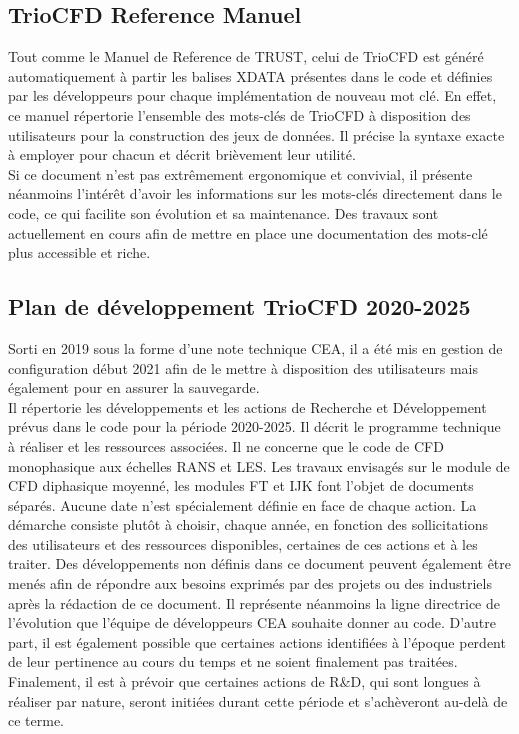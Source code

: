\subsection{TrioCFD Reference Manuel}
Tout comme le Manuel de Reference de TRUST, celui de TrioCFD est généré automatiquement à partir les balises XDATA présentes dans le code et définies par les développeurs pour chaque implémentation de nouveau mot clé. En effet, ce manuel répertorie l'ensemble des mots-clés de TrioCFD à disposition des utilisateurs pour la construction des jeux de données. Il précise la syntaxe exacte à employer pour chacun et décrit brièvement leur utilité.\\
Si ce document n'est pas extrêmement ergonomique et convivial, il présente néanmoins l'intérêt d'avoir les informations sur les mots-clés directement dans le code, ce qui facilite son évolution et sa maintenance. Des travaux sont actuellement en cours afin de mettre en place une documentation des mots-clé plus accessible et riche.

\subsection{Plan de d\'eveloppement TrioCFD 2020-2025}
Sorti en 2019 sous la forme d'une note technique CEA, il a été mis en gestion de configuration début 2021
afin de le mettre à disposition des utilisateurs mais également pour en assurer la sauvegarde.\\
Il répertorie les développements et les actions de Recherche et Développement prévus dans le code pour la période 2020-2025.
Il décrit le programme technique à réaliser et les ressources associées.
Il ne concerne que le code de CFD monophasique aux échelles RANS et LES.
Les travaux envisagés sur le module de CFD diphasique moyenné, les modules FT et IJK font l'objet de documents séparés.
Aucune date n'est spécialement définie en face de chaque action.
La démarche consiste plutôt à choisir, chaque année, en fonction des sollicitations
des utilisateurs et des ressources disponibles, certaines de ces actions et à les traiter.
Des développements non définis dans ce document peuvent également être menés afin de répondre
aux besoins exprimés par des projets ou des industriels après la rédaction de ce document.
Il représente néanmoins la ligne directrice de l'évolution que l'équipe de développeurs CEA souhaite donner au code.
D'autre part, il est également possible que certaines actions identifiées à l'époque perdent de leur pertinence
au cours du temps et ne soient finalement pas traitées.
Finalement, il est à prévoir que certaines actions de R\&D, qui sont longues à réaliser par nature,
seront initiées durant cette période et s'achèveront au-delà de ce terme.


